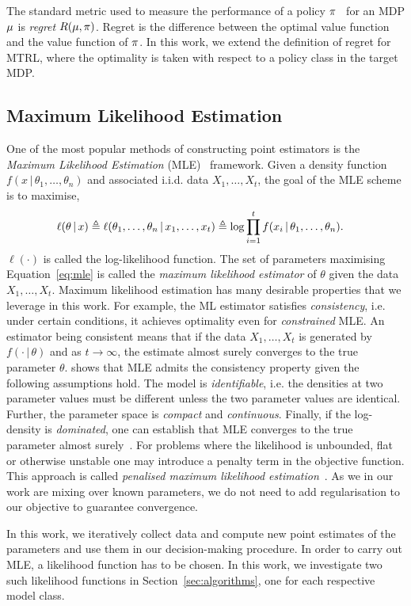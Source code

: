 The standard metric used to measure the performance of a policy $\pi$~\citep{bell1982regret} for an MDP $\mu$ is \textit{regret} $R(\mu, \pi)$. Regret is the difference between the optimal value function and the value function of $\pi$. In this work, we extend the definition of regret for MTRL, where the optimality is taken with respect to a policy class in the target MDP.


\subsection{Maximum Likelihood Estimation}
One of the most popular methods of constructing point estimators is the \emph{Maximum Likelihood Estimation} (MLE)~\citep{casella2021statistical} framework. Given a density function $f(x \, | \, \theta_1, \hdots, \theta_n)$ and associated i.i.d. data $X_1, \hdots, X_t$, the goal of the MLE scheme is to maximise,
\begin{equation}\label{eq:mle}
\hspace*{-1em}  \ell(\theta \, | \, x) \triangleq \ell(\theta_1, \hdots, \theta_n \, | \, x_1, \hdots, x_t) \triangleq \log \prod_{i=1}^t f(x_i \, | \, \theta_1, \hdots, \theta_n).
\end{equation}
$\ell(\cdot)$ is called the log-likelihood function. The set of parameters maximising Equation~\ref{eq:mle} is called the \emph{maximum likelihood estimator} of $\theta$ given the data $X_1, \hdots, X_t$. Maximum likelihood estimation has many desirable properties that we leverage in this work. For example, the ML estimator satisfies \emph{consistency}, i.e. under certain conditions, it achieves optimality even for \emph{constrained} MLE. An estimator being consistent means that if the data $X_1, \hdots, X_t$ is generated by $f(\cdot \, | \, \theta)$ and as $t\rightarrow \infty$, the estimate almost surely converges to the true parameter $\theta$. \citep{kiefer1956consistency} shows that MLE admits the consistency property given the following assumptions hold. The model is \emph{identifiable}, i.e. the densities at two parameter values must be different unless the two parameter values are identical. Further, the parameter space is \emph{compact} and \emph{continuous}. Finally, if the log-density is \emph{dominated}, one can establish that MLE converges to the true parameter almost surely~\citep{newey1987asymmetric}.
For problems where the likelihood is unbounded, flat or otherwise unstable one may introduce a penalty term in the objective function. This approach is called \emph{penalised maximum likelihood estimation}~\citep{ciuperca2003penalized, ouhamma2023bilinear}. As we in our work are mixing over known parameters, we do not need to add regularisation to our objective to guarantee convergence.

In this work, we iteratively collect data and compute new point estimates of the parameters and use them in our decision-making procedure. In order to carry out MLE, a likelihood function has to be chosen. In this work, we investigate two such likelihood functions in Section~\ref{sec:algorithms}, one for each respective model class. 